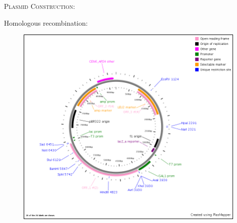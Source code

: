 \documentclass{beamer}
\begin{document}
\begin{frame}
     \begin{center}
        {\large \textsc{Plasmid Construction:}}
    \end{center}
    Homologous recombination:
    \begin{figure}[ht!]
        \includegraphics[width=.3\textwidth]{../Documents/plasMap_pGALFARwt.png}
        \label{fig:ligc}
    \end{figure}



\end{frame}
\end{document}
